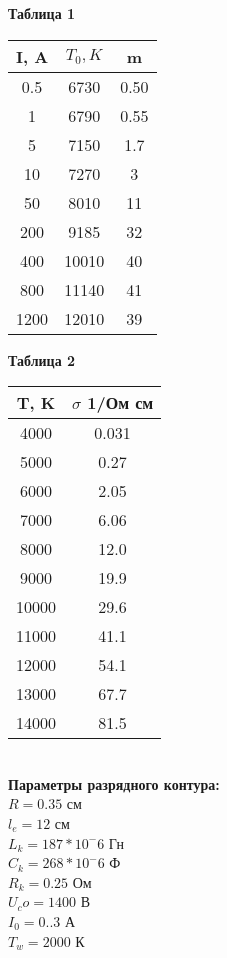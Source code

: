     \hspace{0cm} \textbf{Таблица 1} \\
    
    \begin{tabular}{ | c | c | c | }
    \hline
    I, A & $T_0, K$ & m  \\ \hline
    0.5 & 6730 & 0.50 \\
    1 & 6790 & 0.55 \\
    5 & 7150 & 1.7 \\
    10 & 7270 & 3 \\
    50 & 8010 & 11 \\
    200 & 9185 & 32 \\
    400 & 10010 & 40 \\
    800 & 11140 & 41 \\
    1200 & 12010 & 39 \\
    \hline
    \end{tabular}  
    
    \newpage
    
    \hspace{0cm} \textbf{Таблица 2} \\
    
    \begin{tabular}{ | c | c | }
    \hline
    T, K & $\sigma$ 1/Ом см  \\ \hline
    4000 & 0.031 \\
    5000 & 0.27 \\
    6000 & 2.05 \\
    7000 & 6.06 \\
    8000 & 12.0 \\
    9000 & 19.9 \\
    10000 & 29.6 \\
    11000 & 41.1 \\
    12000 & 54.1 \\
    13000 & 67.7 \\
    14000 & 81.5 \\
    \hline
    \end{tabular} \\
    
    \hspace{0cm} \textbf{Параметры разрядного контура:} \\
    
    $R = 0.35 $ см \\
    $l_e = 12 $ см \\
    $L_k = 187*10^-6 $ Гн \\ 
    $C_k = 268*10^-6 $ Ф \\
    $R_k = 0.25 $ Ом \\
    $U_co = 1400 $ В \\
    $I_0 = 0..3 $ А \\
    $T_w = 2000 $ К \\
    
